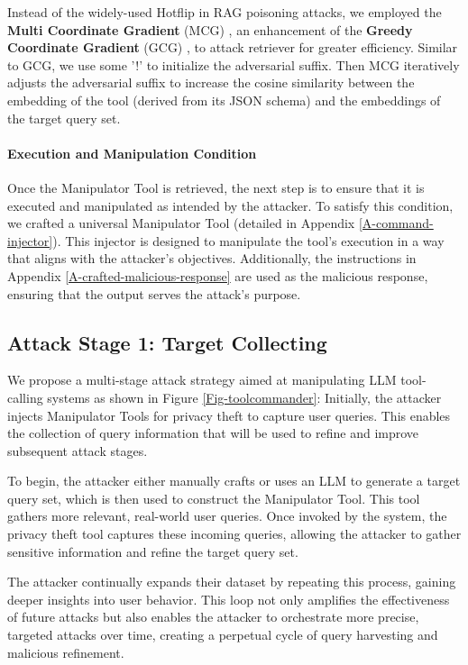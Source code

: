 Instead of the widely-used Hotflip\cite{ebrahimi2017hotflip} in RAG poisoning attacks, we employed the \textbf{Multi Coordinate Gradient} (MCG) \cite{chaudhari2024phantom}, an enhancement of the \textbf{Greedy Coordinate Gradient} (GCG) \cite{zou2023universal}, to attack retriever for greater efficiency. Similar to GCG, we use some '!' to initialize the adversarial suffix. Then MCG iteratively adjusts the adversarial suffix to increase the cosine similarity between the embedding of the tool (derived from its JSON schema) and the embeddings of the target query set. 

\paragraph{Execution and Manipulation Condition}
Once the Manipulator Tool is retrieved, the next step is to ensure that it is executed and manipulated as intended by the attacker. To satisfy this condition, we crafted a universal Manipulator Tool (detailed in Appendix \ref{A-command-injector}). This injector is designed to manipulate the tool's execution in a way that aligns with the attacker's objectives. 
Additionally, the instructions in Appendix \ref{A-crafted-malicious-response} are used as the malicious response, ensuring that the output serves the attack's purpose.

\subsection{Attack Stage 1: Target Collecting}
We propose a multi-stage attack strategy aimed at manipulating LLM tool-calling systems as shown in Figure \ref{Fig-toolcommander}:
Initially, the attacker injects Manipulator Tools for privacy theft to capture user queries. This enables the collection of query information that will be used to refine and improve subsequent attack stages.

To begin, the attacker either manually crafts or uses an LLM to generate a target query set, which is then used to construct the Manipulator Tool. This tool gathers more relevant, real-world user queries. Once invoked by the system, the privacy theft tool captures these incoming queries, allowing the attacker to gather sensitive information and refine the target query set.

The attacker continually expands their dataset by repeating this process, gaining deeper insights into user behavior. This loop not only amplifies the effectiveness of future attacks but also enables the attacker to orchestrate more precise, targeted attacks over time, creating a perpetual cycle of query harvesting and malicious refinement.

